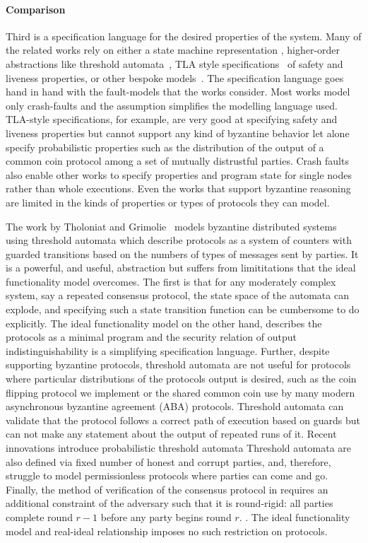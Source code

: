 \paragraph{Comparison}
Third is a specification language for the desired properties of the system.
Many of the related works rely on either a state machine representation \cite{mace}, higher-order abstractions like threshold automata~\cite{formalbyz}, TLA style specifications~\cite{ironfleet,farsite} of safety and liveness properties, or other bespoke models~\cite{verdi}.
The specification language goes hand in hand with the fault-models that the works consider.
Most works model only crash-faults and the assumption simplifies the modelling language used.
TLA-style specifications, for example, are very good at specifying safety and liveness properties but cannot support any kind of byzantine behavior let alone specify probabilistic properties such as the distribution of the output of a common coin protocol among a set of mutually distrustful parties.
Crash faults also enable other works to specify properties and program state for single nodes rather than whole executions. 
Even the works that support byzantine reasoning are limited in the kinds of properties or types of protocols they can model.

The work by Tholoniat and Grimolie~\cite{formalbyz} models byzantine distributed systems using threshold automata which describe protocols as a system of counters with guarded transitions based on the numbers of types of messages sent by parties.
It is a powerful, and useful, abstraction but suffers from limititations that the ideal functionality model overcomes.
The first is that for any moderately complex system, say a repeated consensus protocol, the state space of the automata can explode, and specifying such a state transition function can be cumbersome to do explicitly. 
The ideal functionality model on the other hand, describes the protocols as a minimal program and the security relation of output indistinguishability is a simplifying specification language.
Further, despite supporting byzantine protocols, threshold automata are not useful for protocols where particular distributions of the protocols output is desired, such as the coin flipping protocol we implement or the shared common coin use by many modern asynchronous byzantine agreement (ABA) protocols.
Threshold automata can validate that the protocol follows a correct path of execution based on guards but can not make any statement about the output of repeated runs of it.
Recent innovations introduce probabilistic threshold automata 
Threshold automata are also defined via fixed number of honest and corrupt parties, and, therefore, struggle to model permissionless protocols where parties can come and go.
Finally, the method of verification of the consensus protocol in \cite{formalbyz} requires an additional constraint of the adversary such that it is round-rigid: all parties complete round $r-1$ before any party begins round $r$. .
The ideal functionality model and real-ideal relationship imposes no such restriction on protocols.

